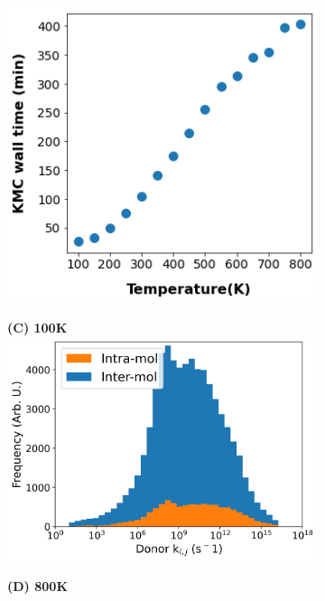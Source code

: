 \begin{figure}
\begin{subfigure}{.5\textwidth}
    \includegraphics[width=\textwidth]{figures/temp_simtime_plot.png}
    \newline
\end{subfigure}
\begin{subfigure}{.5\textwidth}
    \textbf{(C) 100K}
    \centering
    \includegraphics[width=\textwidth]{figures/donor_hopping_rate_clusters_temp100.png}
\end{subfigure}%
\begin{subfigure}{.5\textwidth}
    \textbf{(D) 800K}
    \centering

\end{subfigure}
\end{figure}
